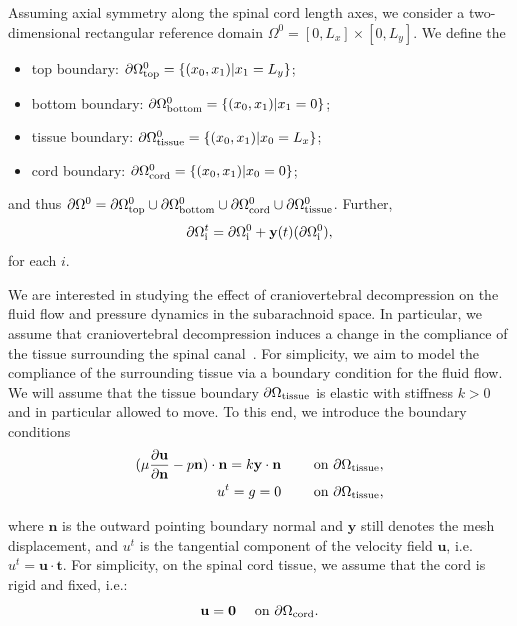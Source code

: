 \documentclass[11pt,a4paper,titlepage]{report}
\begin{document}
Assuming axial symmetry along the spinal cord length axes, we consider
a two-dimensional rectangular reference domain $\Omega^0 = [0, L_x]
\times [0, L_y]$. We define the
\begin{itemize}
\item
  top boundary: $\partial \Omega_{\rm top}^0 = \{ (x_0, x_1) | x_1 = L_y\}$;
\item
  bottom boundary: $\partial \Omega_{\rm bottom}^0 = \{ (x_0, x_1) | x_1 = 0\}$;
\item
  tissue boundary: $\partial \Omega_{\rm tissue}^0 = \{ (x_0, x_1) | x_0 = L_x\}$;
\item
  cord boundary: $\partial \Omega_{\rm cord}^0 = \{ (x_0, x_1) | x_0 = 0\}$;
\end{itemize}
and thus $\partial \Omega^0 = \partial \Omega_{\rm top}^0 \cup
\partial \Omega_{\rm bottom}^0 \cup \partial \Omega_{\rm cord}^0 \cup
\partial \Omega_{\rm tissue}^0$. Further,
\begin{equation}
  \partial \Omega^t_{\rm i} = \partial \Omega^0_{\rm i} + \mathbf{y}(t)(\partial \Omega^0_{\rm i}),
\end{equation}
for each $i$.

We are interested in studying the effect of craniovertebral
decompression on the fluid flow and pressure dynamics in the
subarachnoid space. In particular, we assume that craniovertebral
decompression induces a change in the compliance of the tissue
surrounding the spinal canal~\cite{}. For simplicity, we aim to model
the compliance of the surrounding tissue via a boundary condition for
the fluid flow. We will assume that the tissue boundary $\partial
\Omega_{\rm tissue}$ is elastic with stiffness $k > 0$ and in particular
allowed to move. To this end, we introduce the boundary conditions
\begin{align}
\label{eq:bc:1}
(\mu \frac{\partial \mathbf{u}}{\partial \mathbf{n}} - p \mathbf{n}) \cdot \mathbf{n} = k \mathbf{y} \cdot \mathbf{n} \qquad \text{ on } \partial \Omega_{\rm tissue},\\
\label{eq:bc:3}
u^t = g = 0 \qquad \text{ on } \partial \Omega_{\rm tissue},
\end{align}


where $\mathbf{n}$ is the outward pointing boundary normal and
$\mathbf{y}$ still denotes the mesh displacement, and $u^t$ is the tangential component of the velocity field $\mathbf{u}$, i.e. $u^t = \mathbf{u} \cdot \mathbf{t}$. For simplicity, on
the spinal cord tissue, we assume that the cord is rigid and fixed,
i.e.:
\begin{equation}
  \mathbf{u} = \mathbf{0} \quad \text { on } \partial \Omega_{\rm cord}.
\end{equation}
\end{document}
